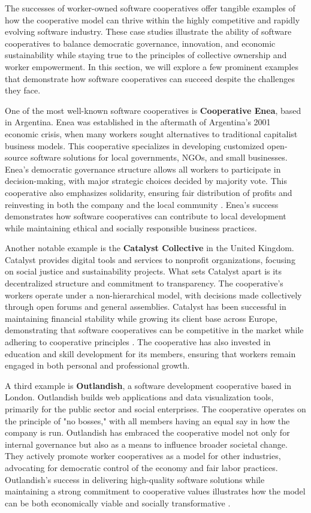 \begin{refsection}
The successes of worker-owned software cooperatives offer tangible examples of how the cooperative model can thrive within the highly competitive and rapidly evolving software industry. These case studies illustrate the ability of software cooperatives to balance democratic governance, innovation, and economic sustainability while staying true to the principles of collective ownership and worker empowerment. In this section, we will explore a few prominent examples that demonstrate how software cooperatives can succeed despite the challenges they face.

One of the most well-known software cooperatives is \textbf{Cooperative Enea}, based in Argentina. Enea was established in the aftermath of Argentina’s 2001 economic crisis, when many workers sought alternatives to traditional capitalist business models. This cooperative specializes in developing customized open-source software solutions for local governments, NGOs, and small businesses. Enea's democratic governance structure allows all workers to participate in decision-making, with major strategic choices decided by majority vote. This cooperative also emphasizes solidarity, ensuring fair distribution of profits and reinvesting in both the company and the local community \cite[pp.~89-91]{vieta2020}. Enea’s success demonstrates how software cooperatives can contribute to local development while maintaining ethical and socially responsible business practices.

Another notable example is the \textbf{Catalyst Collective} in the United Kingdom. Catalyst provides digital tools and services to nonprofit organizations, focusing on social justice and sustainability projects. What sets Catalyst apart is its decentralized structure and commitment to transparency. The cooperative’s workers operate under a non-hierarchical model, with decisions made collectively through open forums and general assemblies. Catalyst has been successful in maintaining financial stability while growing its client base across Europe, demonstrating that software cooperatives can be competitive in the market while adhering to cooperative principles \cite[pp.~122-125]{restakis2012}. The cooperative has also invested in education and skill development for its members, ensuring that workers remain engaged in both personal and professional growth.

A third example is \textbf{Outlandish}, a software development cooperative based in London. Outlandish builds web applications and data visualization tools, primarily for the public sector and social enterprises. The cooperative operates on the principle of "no bosses," with all members having an equal say in how the company is run. Outlandish has embraced the cooperative model not only for internal governance but also as a means to influence broader societal change. They actively promote worker cooperatives as a model for other industries, advocating for democratic control of the economy and fair labor practices. Outlandish’s success in delivering high-quality software solutions while maintaining a strong commitment to cooperative values illustrates how the model can be both economically viable and socially transformative \cite[pp.~52-54]{scholz2016}.


\end{refsection}
